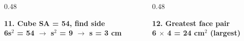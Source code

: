 \documentclass[aspectratio=169,12pt]{beamer}
\begin{document}
\begin{frame}[t]
\begin{columns}[T,onlytextwidth]
\end{columns}
\vspace{0.15em}
\begin{columns}[T,onlytextwidth]
\begin{column}{0.48\textwidth}\begin{AnsCard}\small\textcolor{mmgreenDeep}{\textbf{11. Cube SA = 54, find side}}\\\vspace{0.1em}\textcolor{mmanswerColor}{\textbf{6s$^2$ = 54 $\to$ s$^2$ = 9 $\to$ s = 3 cm}}\end{AnsCard}\end{column}
\begin{column}{0.48\textwidth}\begin{AnsCard}\small\textcolor{mmgreenDeep}{\textbf{12. Greatest face pair}}\\\vspace{0.1em}\textcolor{mmanswerColor}{\textbf{6 $\times$ 4 = 24 cm$^2$ (largest)}}\end{AnsCard}\end{column}
\end{columns}
\end{frame}
\end{document}
